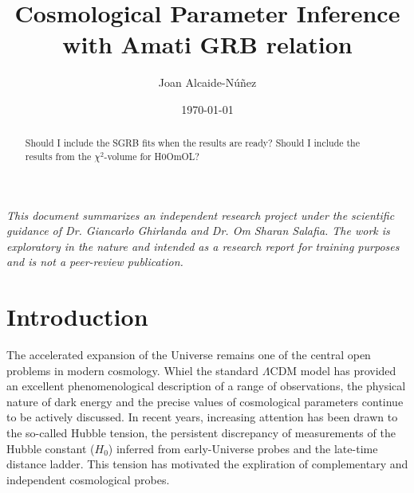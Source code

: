\documentclass[
    aps,
    prd,
    twocolumn,
    nofootinbib,
    floatfix,
    superscriptaddress
]{revtex4-2}
\begin{document}
\title{Cosmological Parameter Inference with Amati GRB relation}

\author{Joan Alcaide-Núñez}

\date{\today}

\maketitle

\begin{abstract}
Should I include the SGRB fits when the results are ready? Should I include the results from the $\chi^2$-volume for H0OmOL?
\end{abstract}


\vspace{1em}

\textit{This document summarizes an independent research project under the scientific guidance of Dr. Giancarlo Ghirlanda and Dr. Om Sharan Salafia. The work is exploratory in the nature and intended as a research report for training purposes and is not a peer-review publication.
}

\section{Introduction}

The accelerated expansion of the Universe remains one of the central open problems in modern cosmology. Whiel the standard $\Lambda$CDM model has provided an excellent phenomenological description of a range of observations, the physical nature of dark energy and the precise values of cosmological parameters continue to be actively discussed. In recent years, increasing attention has been drawn to the so-called Hubble tension, the persistent discrepancy of measurements of the Hubble constant ($H_0$) inferred from early-Universe probes and the late-time distance ladder. This tension has motivated the expliration of complementary and independent cosmological probes.
\end{document}
